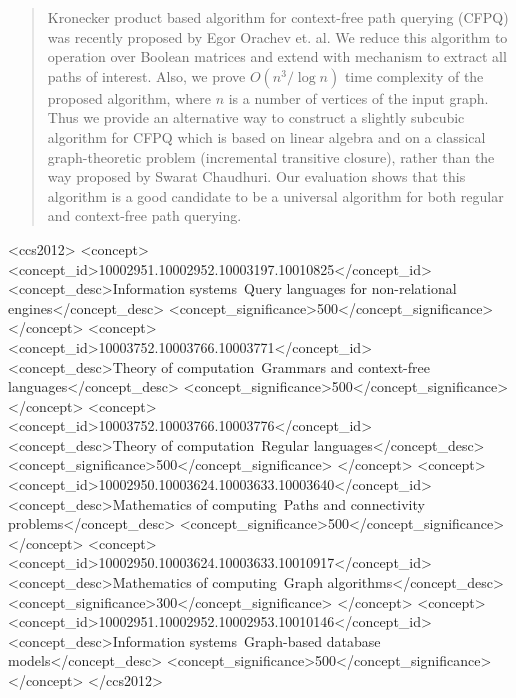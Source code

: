 \documentclass[10pt,sigconf,table]{acmart}
\begin{document}
	\begin{abstract}
	Kronecker product based algorithm for context-free path querying (CFPQ) was recently proposed by Egor Orachev et. al. 
	We reduce this algorithm to operation over Boolean matrices and extend with mechanism to extract all paths of interest. 
	Also, we prove $O(n^3/\log{n})$ time complexity of the proposed algorithm, where $n$ is a number of vertices of the input graph. 
	Thus we provide an alternative way to construct a slightly subcubic algorithm for CFPQ which is based on linear algebra and on a classical graph-theoretic problem (incremental transitive closure), rather than the way proposed by Swarat Chaudhuri. 
	Our evaluation shows that this algorithm is a good candidate to be a universal algorithm for both regular and context-free path querying. 
	\end{abstract}
	
	\begin{CCSXML}
		<ccs2012>
		<concept>
			<concept_id>10002951.10002952.10003197.10010825</concept_id>
			<concept_desc>Information systems~Query languages for non-relational engines</concept_desc>
			<concept_significance>500</concept_significance>
		</concept>
		<concept>
			<concept_id>10003752.10003766.10003771</concept_id>
			<concept_desc>Theory of computation~Grammars and context-free languages</concept_desc>
			<concept_significance>500</concept_significance>
		</concept>
		<concept>
			<concept_id>10003752.10003766.10003776</concept_id>
			<concept_desc>Theory of computation~Regular languages</concept_desc>
			<concept_significance>500</concept_significance>
		</concept>
		<concept>
			<concept_id>10002950.10003624.10003633.10003640</concept_id>
			<concept_desc>Mathematics of computing~Paths and connectivity problems</concept_desc>
			<concept_significance>500</concept_significance>
		</concept>
		<concept>
<concept_id>10002950.10003624.10003633.10010917</concept_id>
<concept_desc>Mathematics of computing~Graph algorithms</concept_desc>
<concept_significance>300</concept_significance>
</concept>
<concept>
<concept_id>10002951.10002952.10002953.10010146</concept_id>
<concept_desc>Information systems~Graph-based database models</concept_desc>
<concept_significance>500</concept_significance>
</concept>
		</ccs2012>
	\end{CCSXML}
	
\end{document}
